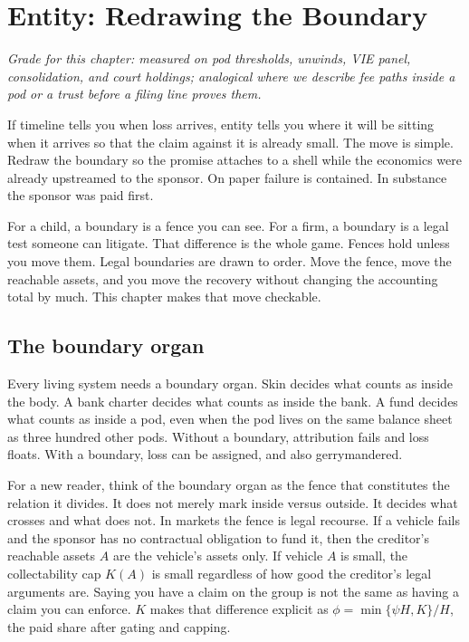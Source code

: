 \chapter{Entity: Redrawing the Boundary}
\label{ch:entity}

\textit{Grade for this chapter: measured on pod thresholds, unwinds, VIE panel, consolidation, and court holdings; analogical where we describe fee paths inside a pod or a trust before a filing line proves them.}

If timeline tells you when loss arrives, entity tells you where it will be sitting when it arrives so that the claim against it is already small. The move is simple. Redraw the boundary so the promise attaches to a shell while the economics were already upstreamed to the sponsor. On paper failure is contained. In substance the sponsor was paid first.

For a child, a boundary is a fence you can see. For a firm, a boundary is a legal test someone can litigate. That difference is the whole game. Fences hold unless you move them. Legal boundaries are drawn to order. Move the fence, move the reachable assets, and you move the recovery without changing the accounting total by much. This chapter makes that move checkable.

\section{The boundary organ}

Every living system needs a boundary organ. Skin decides what counts as inside the body. A bank charter decides what counts as inside the bank. A fund decides what counts as inside a pod, even when the pod lives on the same balance sheet as three hundred other pods. Without a boundary, attribution fails and loss floats. With a boundary, loss can be assigned, and also gerrymandered.

For a new reader, think of the boundary organ as the fence that constitutes the relation it divides. It does not merely mark inside versus outside. It decides what crosses and what does not. In markets the fence is legal recourse. If a vehicle fails and the sponsor has no contractual obligation to fund it, then the creditor's reachable assets $A$ are the vehicle's assets only. If vehicle $A$ is small, the collectability cap $K(A)$ is small regardless of how good the creditor's legal arguments are. Saying you have a claim on the group is not the same as having a claim you can enforce. $K$ makes that difference explicit as $\phi = \min\{\psi H, K\}/H$, the paid share after gating and capping.


